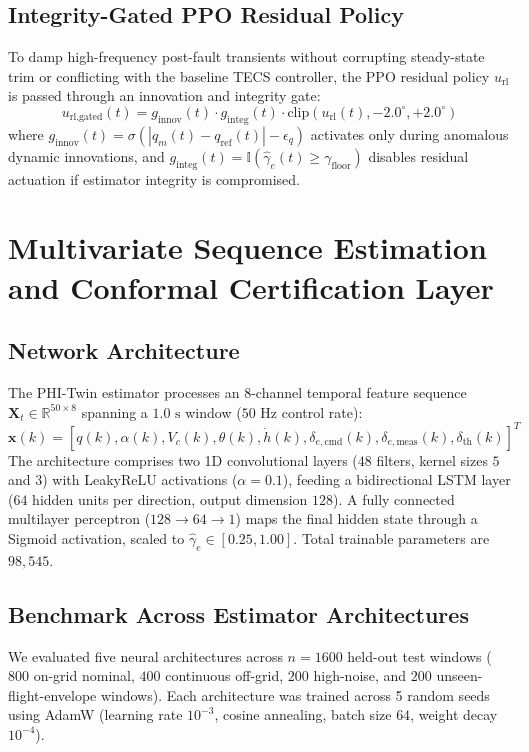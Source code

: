 \documentclass[review,12pt]{elsarticle}
\begin{document}
\subsection{Integrity-Gated PPO Residual Policy}
To damp high-frequency post-fault transients without corrupting steady-state trim or conflicting with the baseline TECS controller, the PPO residual policy $u_{\text{rl}}$ is passed through an innovation and integrity gate:
\begin{equation}
    u_{\text{rl,gated}}(t) = g_{\text{innov}}(t) \cdot g_{\text{integ}}(t) \cdot \text{clip}(u_{\text{rl}}(t), -2.0^\circ, +2.0^\circ)
\end{equation}
where $g_{\text{innov}}(t) = \sigma(|q_m(t) - q_{\text{ref}}(t)| - \epsilon_q)$ activates only during anomalous dynamic innovations, and $g_{\text{integ}}(t) = \mathbb{I}(\hat{\gamma}_e(t) \ge \gamma_{\text{floor}})$ disables residual actuation if estimator integrity is compromised.

\section{Multivariate Sequence Estimation and Conformal Certification Layer}
\label{sec:twin}

\subsection{Network Architecture}
The PHI-Twin estimator processes an 8-channel temporal feature sequence $\bm{X}_t \in \mathbb{R}^{50 \times 8}$ spanning a $1.0\text{ s}$ window ($50\text{ Hz}$ control rate):
\begin{equation}
    \bm{x}(k) = \left[ q(k), \alpha(k), V_c(k), \theta(k), \dot{h}(k), \delta_{e,\text{cmd}}(k), \delta_{e,\text{meas}}(k), \delta_{\text{th}}(k) \right]^T
\end{equation}
The architecture comprises two 1D convolutional layers ($48$ filters, kernel sizes $5$ and $3$) with LeakyReLU activations ($\alpha = 0.1$), feeding a bidirectional LSTM layer ($64$ hidden units per direction, output dimension $128$). A fully connected multilayer perceptron ($128 \to 64 \to 1$) maps the final hidden state through a Sigmoid activation, scaled to $\hat{\gamma}_e \in [0.25, 1.00]$. Total trainable parameters are $98{,}545$.

\subsection{Benchmark Across Estimator Architectures}
We evaluated five neural architectures across $n = 1600$ held-out test windows ($800$ on-grid nominal, $400$ continuous off-grid, $200$ high-noise, and $200$ unseen-flight-envelope windows). Each architecture was trained across 5 random seeds using AdamW (learning rate $10^{-3}$, cosine annealing, batch size $64$, weight decay $10^{-4}$).
\end{document}
